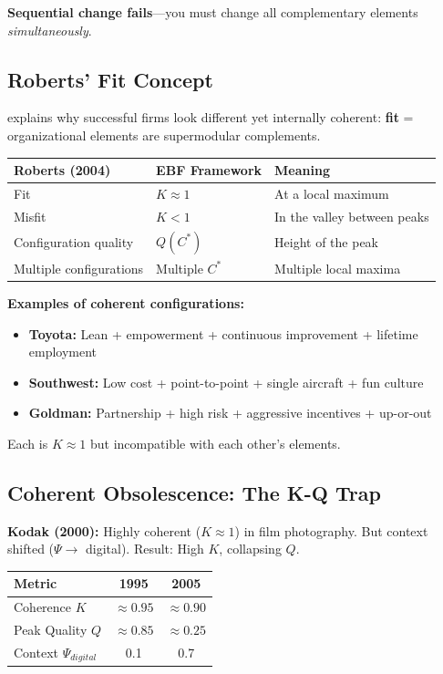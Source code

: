\textbf{Sequential change fails}---you must change all complementary elements \textit{simultaneously}.

\subsection{Roberts' Fit Concept}

\citet{roberts2004} explains why successful firms look different yet internally coherent:
\textbf{fit} = organizational elements are supermodular complements.

\begin{center}
\renewcommand{\arraystretch}{1.2}
\begin{tabular}{@{}lll@{}}
\toprule
\textbf{Roberts (2004)} & \textbf{EBF Framework} & \textbf{Meaning} \\
\midrule
Fit & $K \approx 1$ & At a local maximum \\
Misfit & $K < 1$ & In the valley between peaks \\
Configuration quality & $Q(C^*)$ & Height of the peak \\
Multiple configurations & Multiple $C^*$ & Multiple local maxima \\
\bottomrule
\end{tabular}
\end{center}

\textbf{Examples of coherent configurations:}
\begin{itemize}[nosep]
\item \textbf{Toyota:} Lean + empowerment + continuous improvement + lifetime employment
\item \textbf{Southwest:} Low cost + point-to-point + single aircraft + fun culture
\item \textbf{Goldman:} Partnership + high risk + aggressive incentives + up-or-out
\end{itemize}

Each is $K \approx 1$ but incompatible with each other's elements.

\subsection{Coherent Obsolescence: The K-Q Trap}

\textbf{Kodak (2000):} Highly coherent ($K \approx 1$) in film photography.
But context shifted ($\Psi \to$ digital). Result: High $K$, collapsing $Q$.

\begin{center}
\renewcommand{\arraystretch}{1.2}
\begin{tabular}{@{}lcc@{}}
\toprule
\textbf{Metric} & \textbf{1995} & \textbf{2005} \\
\midrule
Coherence $K$ & $\approx 0.95$ & $\approx 0.90$ \\
Peak Quality $Q$ & $\approx 0.85$ & $\approx 0.25$ \\
Context $\Psi_{digital}$ & 0.1 & 0.7 \\
\bottomrule
\end{tabular}
\end{center}

